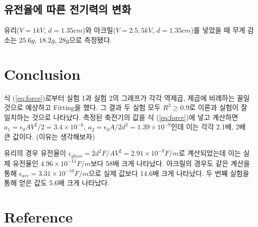 \documentclass[a4paper, 8pt]{article}
\begin{document}
	\subsection{유전율에 따른 전기력의 변화}
	유리($V=1\si{kV}$, $d=1.35{cm}$)와 아크릴($V=2.5, 5\si{kV}$, $d=1.35\si{cm}$)를 넣었을 때 무게 감소는 $25.6\si{g}$, $18.2\si{g}$, $28\si{g}$으로 측정됐다.

\newpage

\section{Conclusion}
	식 (\ref{eq:force})로부터 실험 1과 실험 2의 그래프가 각각 역제곱, 제곱에 비례하는 꼴일 것으로 예상하고 Fitting을 했다.
	그 결과 두 실험 모두 $R^2\ge0.9$로 이론과 실험이 잘 일치하는 것으로 나타났다.
	측정된 축전기의 값을 식 (\ref{eq:force})에 넣고 계산하면 
	$a_1=\epsilon{}_0AV^{2}/2=3.4\times10^{-6}$, $a_2=\epsilon{}_0A/2d^2=1.39\times10^{-9}$인데 이는 각각 2.1배, 2배 큰 값이다. (이유는 생각해보자)

	유리의 경우 유전율이 $\epsilon{}_{glass}=2d^2F/AV^2=2.91\times10^{-9}\si{F/m}$로 계산되었는데 이는 실제 유전율인 $4.96\times10^{-11}\si{F/m}$보다 58배 크게 나타났다. 
	아크릴의 경우도 같은 계산을 통해 $\epsilon{}_{arc}=3.31\times10^{-10}\si{F/m}$으로 실제 값보다 14.6배 크게 나타났다. 두 번째 실험을 통해 얻은 값도 5.6배 크게 나타났다.

	 
	
\section{Reference}
\end{document}
